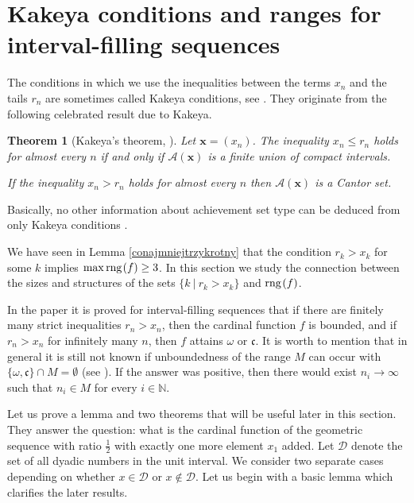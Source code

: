 \documentclass{amsart}
\newtheorem{theorem}{Theorem}[section]
\theoremstyle{definition}
\newcommand{\rng}{{\rm rng} \hspace{0.03cm}}
\begin{document}
\section{Kakeya conditions and ranges for interval-filling sequences}

The conditions in which we use the inequalities between the terms $x_n$ and the tails $r_n$ are sometimes called Kakeya conditions, see \cite{MarMis}. They originate from the following celebrated result due to Kakeya.
\begin{theorem}[Kakeya's theorem, \cite{Kakeya}]\label{ThmKakeya}
Let $\mathbf{x}=(x_{n})$. The inequality $x_n\leq r_n$ holds for almost every $n$ if and only if $\mathcal{A}(\mathbf{x})$ is a finite union of compact intervals.

If the inequality $x_n>r_n$ holds for almost every $n$ then $\mathcal{A}(\mathbf{x})$ is a Cantor set.
\end{theorem}
Basically, no other information about achievement set type can be deduced from only Kakeya conditions \cite{MarMis}.

We have seen in Lemma \ref{conajmniejtrzykrotny} that the condition $r_{k}>x_{k}$ for some $k$ implies $\max\rng (f)\geq 3$. In this section we study the connection between the sizes and structures of the sets $\{k\ |\ r_{k}>x_{k}\}$ and $\rng (f)$.

In the paper \cite[Theorem 3.8]{cardfun} it is proved for interval-filling sequences that if there are finitely many strict inequalities $r_n>x_n$, then the cardinal function $f$ is bounded, and if $r_n>x_n$ for infinitely many $n$, then $f$ attains $\omega$ or $\mathfrak{c}$. It is worth to mention that in general it is still not known if unboundedness of the range $M$ can occur with $\{\omega,\mathfrak{c}\}\cap M=\emptyset$ (see \cite[Problems 2.12 and 2.13]{cardfun}). If the answer was positive, then there would exist $n_i\to \infty$ such that $n_i\in M$ for every $i\in\mathbb{N}$. %

Let us prove a lemma and two theorems that will be useful later in this section. They answer the question: what is the cardinal function of the geometric sequence with ratio $\frac{1}{2}$ with exactly one more element $x_{1}$ added. Let $\mathcal{D}$ denote the set of all dyadic numbers in the unit interval. We consider two separate cases depending on whether $x\in\mathcal{D}$ or $x\notin\mathcal{D}$. Let us begin with a basic lemma which clarifies the later results. 
\end{document}
